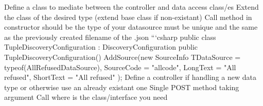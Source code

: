 \markdownRendererUlItem Define a  class to mediate between the controller and data access class/es\markdownRendererUlItemEnd 
\markdownRendererUlItem Extend the  class of the desired type (extend base class if non-existant)\markdownRendererUlItemEnd 
\markdownRendererUlItem Call  method in constructor\markdownRendererInterblockSeparator
{}\markdownRendererUlBeginTight
\markdownRendererUlItem {} should be the type of your datasource\markdownRendererUlItemEnd 
\markdownRendererUlItem {} must be unique and the same as the previously created filename of the .json ```csharp public class TupleDiscoveryConfiguration : DiscoveryConfiguration \markdownRendererLeftBrace{} public TupleDiscoveryConfiguration() \markdownRendererLeftBrace{} AddSource(new SourceInfo \markdownRendererLeftBrace{} TDataSource = typeof(AllRefusedDataSource), SourceCode = "allcode", LongText = "All refused", ShortText = "All refused" \markdownRendererRightBrace{});\markdownRendererUlItemEnd 
\markdownRendererUlEndTight \markdownRendererUlItemEnd 
\markdownRendererUlEnd \markdownRendererInterblockSeparator
{}\markdownRendererInterblockSeparator
{}\markdownRendererUlBeginTight
\markdownRendererUlItem Define a controller if handling a new data type or otherwise use an already existant one \markdownRendererUlItemEnd 
\markdownRendererUlItem Single POST method taking  argument\markdownRendererUlItemEnd 
\markdownRendererUlItem Call   where  is the  class/interface you need \markdownRendererUlItemEnd 
\markdownRendererUlEndTight \relax